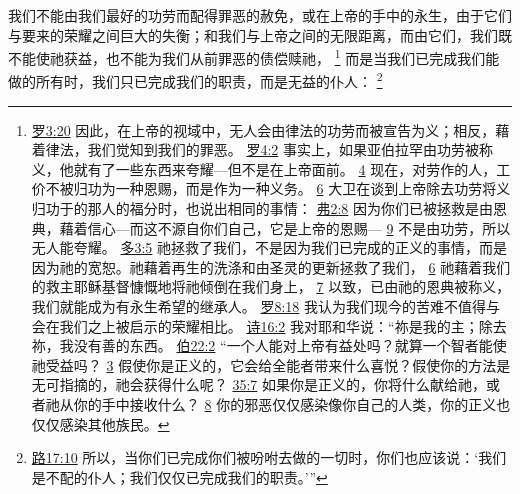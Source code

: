 \documentclass[12pt, a4paper, oneside]{ctexart}
\newcounter{parnum}[section]
\newcommand{\N}{%
   \noindent\refstepcounter{parnum}%
    \makebox[\parindent][l]{\textbf{\arabic{parnum}.}}}
\begin{document}
\N 我们不能由我们最好的功劳而配得罪恶的赦免，或在上帝的手中的永生，由于它们与要来的荣耀之间巨大的失衡；和我们与上帝之间的无限距离，而由它们，我们既不能使祂获益，也不能为我们从前罪恶的债偿赎祂，
	\footnote {
		\href{https://biblehub.com/romans/3-20.htm}{罗3:20} 因此，在上帝的视域中，无人会由律法的功劳而被宣告为义；相反，藉着律法，我们觉知到我们的罪恶。
		\href{https://biblehub.com/romans/4-2.htm}{罗4:2} 事实上，如果亚伯拉罕由功劳被称义，他就有了一些东西来夸耀---但不是在上帝面前。
		\href{https://biblehub.com/romans/4-4.htm}{4} 现在，对劳作的人，工价不被归功为一种恩赐，而是作为一种义务。
		\href{https://biblehub.com/romans/4-6.htm}{6} 大卫在谈到上帝除去功劳将义归功于的那人的福分时，也说出相同的事情：
		\href{https://biblehub.com/ephesians/2-8.htm}{弗2:8} 因为你们已被拯救是由恩典，藉着信心---而这不源自你们自己，它是上帝的恩赐---
		\href{https://biblehub.com/ephesians/2-9.htm}{9} 不是由功劳，所以无人能夸耀。
		\href{https://biblehub.com/titus/3-5.htm}{多3:5} 祂拯救了我们，不是因为我们已完成的正义的事情，而是因为祂的宽恕。祂藉着再生的洗涤和由圣灵的更新拯救了我们，
		\href{https://biblehub.com/titus/3-6.htm}{6} 祂藉着我们的救主耶稣基督慷慨地将祂倾倒在我们身上，
		\href{https://biblehub.com/titus/3-7.htm}{7} 以致，已由祂的恩典被称义，我们就能成为有永生希望的继承人。
		\href{https://biblehub.com/romans/8-18.htm}{罗8:18} 我认为我们现今的苦难不值得与会在我们之上被启示的荣耀相比。
		\href{https://biblehub.com/psalms/16-2.htm}{诗16:2} 我对耶和华说：“祢是我的主；除去祢，我没有善的东西。
		\href{https://biblehub.com/job/22-2.htm}{伯22:2} “一个人能对上帝有益处吗？就算一个智者能使祂受益吗？
		\href{https://biblehub.com/job/22-3.htm}{3} 假使你是正义的，它会给全能者带来什么喜悦？假使你的方法是无可指摘的，祂会获得什么呢？
		\href{https://biblehub.com/job/35-7.htm}{35:7} 如果你是正义的，你将什么献给祂，或者祂从你的手中接收什么？
        \href{https://biblehub.com/job/35-8.htm}{8} 你的邪恶仅仅感染像你自己的人类，你的正义也仅仅感染其他族民。
	}
	而是当我们已完成我们能做的所有时，我们只已完成我们的职责，而是无益的仆人：
	\footnote {
		\href{https://biblehub.com/luke/17-10.htm}{路17:10} 所以，当你们已完成你们被吩咐去做的一切时，你们也应该说：‘我们是不配的仆人；我们仅仅已完成我们的职责。’”
	}
\end{document}
